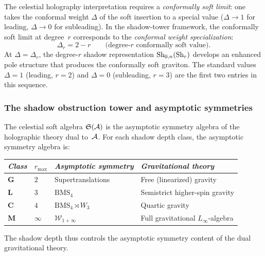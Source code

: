 \begin{remark}
\label{rem:thqg-VI-conformally-soft}
The celestial holography interpretation requires a
\emph{conformally soft limit}: one takes the conformal weight
$\Delta$ of the soft insertion to a special value
($\Delta \to 1$ for leading, $\Delta \to 0$ for subleading).
In the shadow-tower framework, the conformally soft limit at
degree~$r$ corresponds to the \emph{conformal weight
specialization}:
\[
\Delta_r = 2 - r
\qquad
\text{(degree-$r$ conformally soft value)}.
\]
At $\Delta = \Delta_r$, the degree-$r$ shadow representation
$\operatorname{Sh}_{0,n}(\operatorname{Sh}_r)$ develops an enhanced pole structure that
produces the conformally soft graviton. The standard values
$\Delta = 1$ (leading, $r=2$) and $\Delta = 0$ (subleading,
$r=3$) are the first two entries in this sequence.
\end{remark}

\subsubsection{The shadow obstruction tower and asymptotic symmetries}

\begin{proposition}
\label{prop:thqg-VI-asymptotic-symmetry}
The celestial soft algebra $\mathfrak{S}(\mathcal{A})$ is the asymptotic
symmetry algebra of the holographic theory dual to~$\mathcal{A}$. For each
shadow depth class, the asymptotic symmetry algebra is:
\begin{center}
\small
\renewcommand{\arraystretch}{1.15}
\begin{tabular}{llll}
\toprule
\emph{Class} &
$r_{\max}$ &
\emph{Asymptotic symmetry} &
\emph{Gravitational theory} \\
\midrule
$\mathbf{G}$ &
 $2$ &
 Supertranslations &
 Free (linearized) gravity \\
$\mathbf{L}$ &
 $3$ &
 $\mathrm{BMS}_4$ &
 Semistrict higher-spin gravity \\
$\mathbf{C}$ &
 $4$ &
 $\mathrm{BMS}_4 \rtimes W_3$ &
 Quartic gravity \\
$\mathbf{M}$ &
 $\infty$ &
 $\mathcal{W}_{1+\infty}$ &
 Full gravitational $L_\infty$-algebra \\
\bottomrule
\end{tabular}
\end{center}
The shadow depth thus controls the asymptotic symmetry content
of the dual gravitational theory.
\end{proposition}

